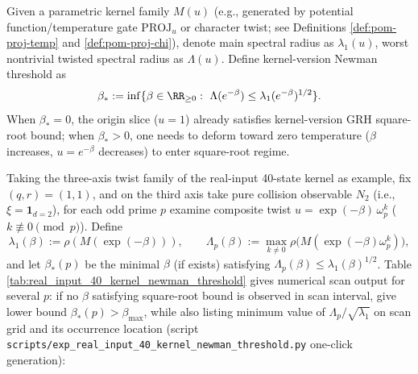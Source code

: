 \begin{definition}\label{def:kernel-newman-threshold}
Given a parametric kernel family \(M(u)\) (e.g., generated by potential function/temperature gate \(\mathrm{PROJ}_u\) or character twist; see Definitions \ref{def:pom-proj-temp} and \ref{def:pom-proj-chi}), denote main spectral radius as \(\lambda_1(u)\), worst nontrivial twisted spectral radius as \(\Lambda(u)\).
Define kernel-version Newman threshold as
\[
\beta_\ast:=\inf\{\beta\in\RR_{\ge 0}:\ \Lambda(e^{-\beta})\le \lambda_1(e^{-\beta})^{1/2}\}.
\]
When \(\beta_\ast=0\), the origin slice (\(u=1\)) already satisfies kernel-version GRH square-root bound; when \(\beta_\ast>0\), one needs to deform toward zero temperature (\(\beta\) increases, \(u=e^{-\beta}\) decreases) to enter square-root regime.
\end{definition}

\begin{remark}\label{rem:kernel-newman-threshold-repro}
Taking the three-axis twist family of the real-input 40-state kernel as example, fix \((q,r)=(1,1)\), and on the third axis take pure collision observable \(N_2\) (i.e., \(\xi=\mathbf{1}_{d=2}\)), for each odd prime \(p\) examine composite twist
\(
u=\exp(-\beta)\,\omega_p^k
\)
(\(k\not\equiv 0\!\!\pmod p\)). Define
\[
\lambda_1(\beta):=\rho(M(\exp(-\beta))),\qquad
\Lambda_p(\beta):=\max_{k\neq 0}\rho\bigl(M(\exp(-\beta)\omega_p^k)\bigr),
\]
and let \(\beta_\ast(p)\) be the minimal \(\beta\) (if exists) satisfying \(\Lambda_p(\beta)\le \lambda_1(\beta)^{1/2}\).
Table \ref{tab:real_input_40_kernel_newman_threshold} gives numerical scan output for several \(p\): if no \(\beta\) satisfying square-root bound is observed in scan interval, give lower bound \(\beta_\ast(p)>\beta_{\max}\), while also listing minimum value of \(\Lambda_p/\sqrt{\lambda_1}\) on scan grid and its occurrence location (script \texttt{scripts/exp\_real\_input\_40\_kernel\_newman\_threshold.py} one-click generation):

\end{remark}

